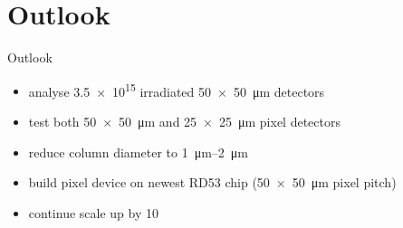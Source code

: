 \section{Outlook}
\begin{frame}{Outlook}

	\begin{minipage}[c][4cm]{\textwidth}
		\begin{itemize}\itemfill
			\item analyse \SI{3.5e15}{\ncm} irradiated \SI{50x50}{\micro\meter} detectors
			\item test both \SI{50x50}{\micro\meter} and \SI{25x25}{\micro\meter} pixel detectors
			\item reduce column diameter to \SIrange{1}{2}{\micro\meter}
			\item build pixel device on newest RD53 chip (\SI{50x50}{\micro\meter} pixel pitch)
			\item continue scale up by \SI{10}{\times}
		\end{itemize}
	\end{minipage}
	
\end{frame}
